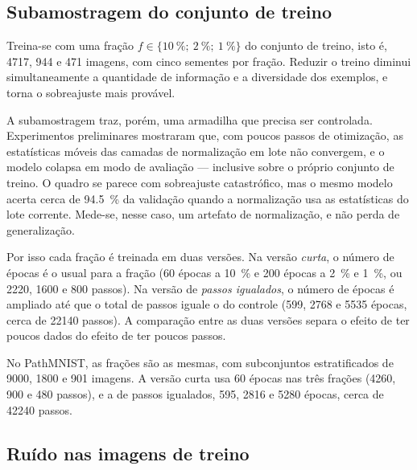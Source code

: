 \subsection{Subamostragem do conjunto de treino}
\label{sec:subamostragem}

Treina-se com uma fração $f \in \{\SI{10}{\percent};\ \SI{2}{\percent};\
\SI{1}{\percent}\}$ do conjunto de treino, isto é, \num{4717}, \num{944} e
\num{471} imagens, com cinco sementes por fração. Reduzir o treino diminui
simultaneamente a quantidade de informação e a diversidade dos exemplos, e
torna o sobreajuste mais provável.

A subamostragem traz, porém, uma armadilha que precisa ser controlada.
Experimentos preliminares mostraram que, com poucos passos de otimização, as
estatísticas móveis das camadas de normalização em lote não convergem, e o
modelo colapsa em modo de avaliação --- inclusive sobre o próprio conjunto de
treino. O quadro se parece com sobreajuste catastrófico, mas o mesmo modelo
acerta cerca de \SI{94,5}{\percent} da validação quando a normalização usa as
estatísticas do lote corrente. Mede-se, nesse caso, um artefato de
normalização, e não perda de generalização.

Por isso cada fração é treinada em duas versões. Na versão \emph{curta}, o
número de épocas é o usual para a fração (60 épocas a \SI{10}{\percent} e 200
épocas a \SI{2}{\percent} e \SI{1}{\percent}, ou \num{2220}, \num{1600} e
\num{800} passos). Na versão de \emph{passos igualados}, o número de épocas é
ampliado até que o total de passos iguale o do controle (599, \num{2768} e
\num{5535} épocas, cerca de \num{22140} passos). A comparação entre as duas
versões separa o efeito de ter poucos dados do efeito de ter poucos passos.

No PathMNIST, as frações são as mesmas, com subconjuntos estratificados de
\num{9000}, \num{1800} e \num{901} imagens. A versão curta usa 60 épocas nas
três frações (\num{4260}, 900 e 480 passos), e a de passos igualados, 595,
\num{2816} e \num{5280} épocas, cerca de \num{42240} passos.

\subsection{Ruído nas imagens de treino}
\label{sec:ruido-imagem}


